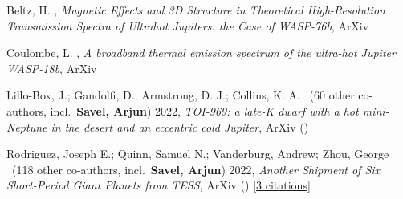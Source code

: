 \item[{\color{numcolor}\scriptsize4}] Beltz, H. , \emph{Magnetic Effects and 3D Structure in Theoretical High-Resolution Transmission Spectra of Ultrahot Jupiters: the Case of WASP-76b}, ArXiv\

\item[{\color{numcolor}\scriptsize3}] Coulombe, L. , \emph{A broadband thermal emission spectrum of the ultra-hot Jupiter WASP-18b}, ArXiv\

\item[{\color{numcolor}\scriptsize2}] Lillo-Box, J.; Gandolfi, D.; Armstrong, D. J.; Collins, K. A. \etal \ ({60} other co-authors, incl.\ \textbf{Savel, Arjun}) 2022, \emph{TOI-969: a late-K dwarf with a hot mini-Neptune in the desert and an eccentric cold Jupiter}, ArXiv ()

\item[{\color{numcolor}\scriptsize1}] Rodriguez, Joseph E.; Quinn, Samuel N.; Vanderburg, Andrew; Zhou, George \etal \ ({118} other co-authors, incl.\ \textbf{Savel, Arjun}) 2022, \emph{Another Shipment of Six Short-Period Giant Planets from TESS}, ArXiv () [\href{https://ui.adsabs.harvard.edu/abs/2022arXiv220505709R}{3 citations}]
